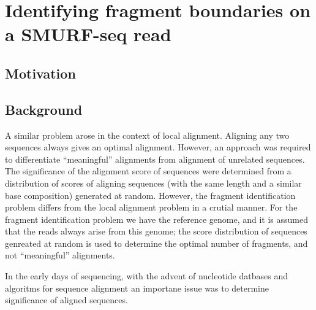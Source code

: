 
\chapter{Identifying fragment boundaries on a SMURF-seq read}
\label{ch4}

\section{Motivation}


\section{Background}
A similar problem arose in the context of local alignment\cite{}.
Aligning any two sequences always gives an optimal alignment. However,
an approach was required to differentiate ``meaningful'' alignments from
alignment of unrelated sequences.
The significance of the alignment score of sequences were determined
from a distribution of scores of aligning sequences (with the same
length and a similar base composition) generated at random.
However, the fragment identification problem differs from the local
alignment problem in a crutial manner. For the fragment identification
problem we have the reference genome, and it is assumed that the reads
always arise from this genome; the score distribution of sequences
genreated at random is used to determine the optimal number of
fragments, and not ``meaningful'' alignments.

In the early days of sequencing, with the advent of nucleotide datbases
\cite{} and algoritms for sequence alignment \cite{} an importane issue
was to determine significance of aligned sequences.

